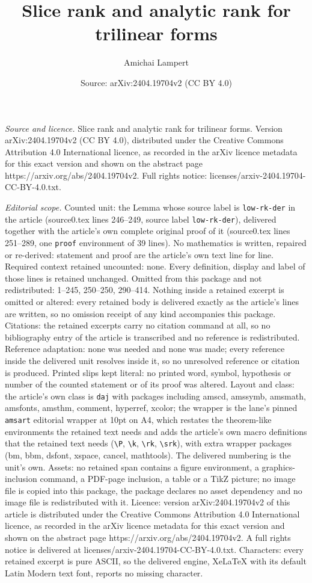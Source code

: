 \documentclass[10pt,a4paper]{amsart}
\title[Slice rank and analytic rank for trilinear forms]{Slice rank and analytic rank for trilinear forms}
\author{Amichai Lampert}
\date{Source: arXiv:2404.19704v2 (CC BY 4.0)}
\begin{document}
\maketitle

\noindent\emph{Source and licence.} Slice rank and analytic rank for trilinear forms. Version arXiv:2404.19704v2 (CC BY 4.0), distributed under the Creative Commons Attribution 4.0 International licence, as recorded in the arXiv licence metadata for this exact version and shown on the abstract page https://arxiv.org/abs/2404.19704v2. Full rights notice: licenses/arxiv-2404.19704-CC-BY-4.0.txt.\par\smallskip

\noindent\textit{Editorial scope.} Counted unit: the Lemma whose source label is \texttt{low-rk-der} in the article (source0.tex lines 246--249, source label \texttt{low-rk-der}), delivered together with the article's own complete original proof of it (source0.tex lines 251--289, one \texttt{proof} environment of 39 lines). No mathematics is written, repaired or re-derived: statement and proof are the article's own text line for line. Required context retained uncounted: none. Every definition, display and label of those lines is retained unchanged. Omitted from this package and not redistributed: 1--245, 250--250, 290--414. Nothing inside a retained excerpt is omitted or altered: every retained body is delivered exactly as the article's lines are written, so no omission receipt of any kind accompanies this package. Citations: the retained excerpts carry no citation command at all, so no bibliography entry of the article is transcribed and no reference is redistributed. Reference adaptation: none was needed and none was made; every reference inside the delivered unit resolves inside it, so no unresolved reference or citation is produced. Printed slips kept literal: no printed word, symbol, hypothesis or number of the counted statement or of its proof was altered. Layout and class: the article's own class is \texttt{daj} with packages including amscd, amssymb, amsmath, amsfonts, amsthm, comment, hyperref, xcolor; the wrapper is the lane's pinned \texttt{amsart} editorial wrapper at 10pt on A4, which restates the theorem-like environments the retained text needs and adds the article's own macro definitions that the retained text needs (\texttt{\textbackslash P}, \texttt{\textbackslash k}, \texttt{\textbackslash rk}, \texttt{\textbackslash srk}), with extra wrapper packages (bm, bbm, dsfont, xspace, cancel, mathtools). The delivered numbering is the unit's own. Assets: no retained span contains a figure environment, a graphics-inclusion command, a PDF-page inclusion, a table or a TikZ picture; no image file is copied into this package, the package declares no asset dependency and no image file is redistributed with it. Licence: version arXiv:2404.19704v2 of this article is distributed under the Creative Commons Attribution 4.0 International licence, as recorded in the arXiv licence metadata for this exact version and shown on the abstract page https://arxiv.org/abs/2404.19704v2. A full rights notice is delivered at licenses/arxiv-2404.19704-CC-BY-4.0.txt. Characters: every retained excerpt is pure ASCII, so the delivered engine, XeLaTeX with its default Latin Modern text font, reports no missing character.
\end{document}
